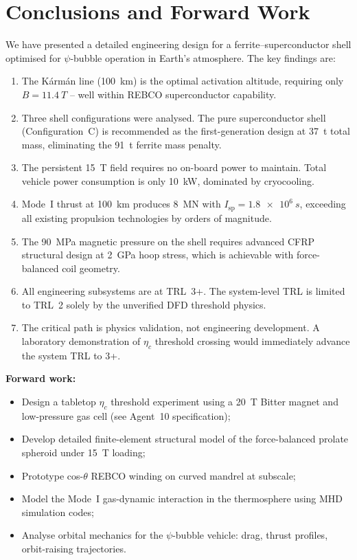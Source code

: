 \documentclass[11pt,a4paper]{article}
\begin{document}
\section{Conclusions and Forward Work}\label{sec:conclusions}

We have presented a detailed engineering design for a ferrite--superconductor
shell optimised for $\psi$-bubble operation in Earth's atmosphere. The key
findings are:

\begin{enumerate}
\item The K\'arm\'an line (\SI{100}{km}) is the optimal activation altitude,
requiring only $B = \SI{11.4}{T}$ -- well within REBCO superconductor
capability.

\item Three shell configurations were analysed. The pure superconductor
shell (Configuration~C) is recommended as the first-generation design at
\SI{37}{t} total mass, eliminating the \SI{91}{t} ferrite mass penalty.

\item The persistent \SI{15}{T} field requires no on-board power to
maintain. Total vehicle power consumption is only \SI{10}{kW}, dominated
by cryocooling.

\item Mode~I thrust at \SI{100}{km} produces \SI{8}{MN} with $I_{\mathrm{sp}}
= \SI{1.8e6}{s}$, exceeding all existing propulsion technologies by
orders of magnitude.

\item The \SI{90}{MPa} magnetic pressure on the shell requires advanced
CFRP structural design at \SI{2}{GPa} hoop stress, which is achievable
with force-balanced coil geometry.

\item All engineering subsystems are at TRL~3+. The system-level TRL is
limited to TRL~2 solely by the unverified DFD threshold physics.

\item The critical path is physics validation, not engineering development.
A laboratory demonstration of $\eta_c$ threshold crossing would immediately
advance the system TRL to 3+.
\end{enumerate}

\textbf{Forward work:}
\begin{itemize}[nosep]
\item Design a tabletop $\eta_c$ threshold experiment using a \SI{20}{T}
Bitter magnet and low-pressure gas cell (see Agent~10 specification);
\item Develop detailed finite-element structural model of the force-balanced
prolate spheroid under \SI{15}{T} loading;
\item Prototype cos-$\theta$ REBCO winding on curved mandrel at subscale;
\item Model the Mode~I gas-dynamic interaction in the thermosphere using
MHD simulation codes;
\item Analyse orbital mechanics for the $\psi$-bubble vehicle: drag, thrust
profiles, orbit-raising trajectories.
\end{itemize}
\end{document}
